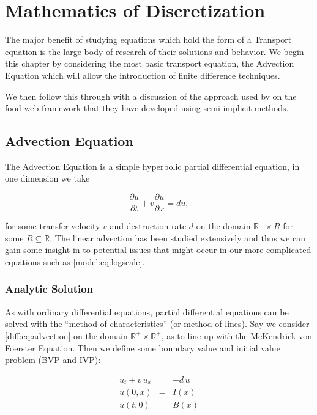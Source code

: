 \documentclass[../main.tex]{subfiles}
\begin{document}
  \chapter{Mathematics of Discretization}\label{chapter:differences}
  The major benefit of studying equations which hold the form of a Transport equation is the large body of research of their solutions and behavior. We begin this chapter by considering the most basic transport equation, the Advection Equation which will allow the introduction of finite difference techniques.

  We then follow this through with a discussion of the approach used by \cite{hartvig2011} on the food web framework that they have developed using semi-implicit methods.

  \section{Advection Equation}
  The Advection Equation is a simple hyperbolic partial differential equation, in one dimension we take

  \begin{equation} \label{diff:eq:advection}
    \frac{\partial u}{\partial t} + v \frac{\partial u}{\partial x} = d u,
  \end{equation}

  for some transfer velocity $v$ and destruction rate $d$ on the domain $\mathbb{R}^+ \times R$ for some $R \subseteq \mathbb{R}$. The linear advection has been studied extensively and thus we can gain some insight in to potential issues that might occur in our more complicated equations such as \autoref{model:eq:logscale}.

  \subsection{Analytic Solution}
  As with ordinary differential equations, partial differential equations can be solved with the ``method of characteristics'' (or method of lines). Say we consider \autoref{diff:eq:advection} on the domain $\mathbb{R}^+ \times \mathbb{R}^+$, as to line up with the McKendrick-von Foerster Equation. Then we define some boundary value and initial value problem (BVP and IVP):

  \begin{eqnarray} \label{diff:eq:advectionbvp}
    u_t + v \, u_x  &=& + d \, u \nonumber \\
    u(0, x) &=& I(x) \nonumber \\
    u(t, 0) &=& B(x)
  \end{eqnarray}
\end{document}
